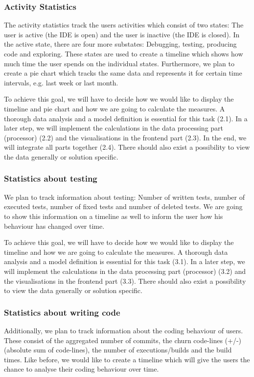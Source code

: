 \documentclass{seal_article}
\begin{document}
\subsubsection{Activity Statistics}
The activity statistics track the users activities which consist of two states: The user is active (the IDE is open) and the user is inactive (the IDE is closed). In the active state, there are four more substates: Debugging, testing, producing code and exploring. These states are used to create a timeline which shows how much time the user spends on the individual states. Furthermore, we plan to create a pie chart which tracks the same data and represents it for certain time intervals, e.g. last week or last month.

To achieve this goal, we will have to decide how we would like to display the timeline and pie chart and how we are going to calculate the measures. A thorough data analysis and a model definition is essential for this task (2.1). In a later step, we will implement the calculations in the data processing part (processor) (2.2) and the visualisations in the frontend part (2.3). In the end, we will integrate all parts together (2.4). There should also exist a possibility to ​view the data generally or solution specific.

\subsubsection{Statistics about testing}
We plan to track information about testing: Number of written tests, number of executed tests, number of fixed tests and number of deleted tests. We are going to show this information on a timeline as well to inform the user how his behaviour has changed over time.

To achieve this goal, we will have to decide how we would like to display the timeline and how we are going to calculate the measures. A thorough data analysis and a model definition is essential for this task (3.1). In a later step, we will implement the calculations in the data processing part (processor) (3.2) and the visualisations in the frontend part (3.3). There should also exist a possibility to ​view the data generally or solution specific.

\subsubsection{Statistics about writing code}
Additionally, we plan to track information about the coding behaviour of users. These consist of the aggregated number of commits, the ​churn code-lines (+/-) (absolute sum of code-lines), the number of executions/builds and the build times. Like before, we would like to create a timeline which will give the users the chance to analyse their coding behaviour over time.
\end{document}
